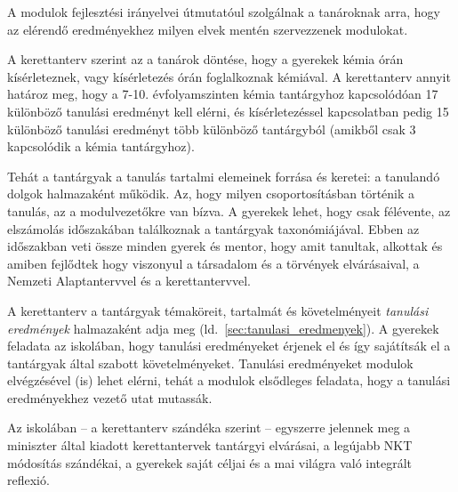A modulok fejlesztési irányelvei útmutatóul szolgálnak a tanároknak arra, hogy az elérendő eredményekhez milyen elvek mentén szervezzenek modulokat.


A kerettanterv szerint az a tanárok döntése, hogy a gyerekek kémia órán kísérleteznek, vagy kísérletezés órán foglalkoznak kémiával. A kerettanterv annyit határoz meg, hogy  a 7-10. évfolyamszinten kémia tantárgyhoz kapcsolódóan 17 különböző tanulási eredményt kell elérni, és kísérletezéssel kapcsolatban pedig 15 különböző tanulási eredményt több különböző tantárgyból (amikből csak 3 kapcsolódik a kémia tantárgyhoz).

Tehát a tantárgyak a tanulás tartalmi elemeinek forrása és keretei: a tanulandó dolgok halmazaként működik. Az, hogy milyen csoportosításban történik a tanulás, az a modulvezetőkre van bízva. A gyerekek lehet, hogy csak félévente, az elszámolás időszakában találkoznak a tantárgyak taxonómiájával. Ebben az időszakban veti össze minden gyerek és mentor, hogy amit tanultak, alkottak és amiben fejlődtek hogy viszonyul a társadalom és a törvények elvárásaival, a Nemzeti Alaptantervvel és a kerettantervvel.

A kerettanterv a tantárgyak témaköreit, tartalmát és követelményeit \emph{tanulási eredmények} halmazaként adja meg (ld.~\ref{sec:tanulasi_eredmenyek}). A gyerekek feladata az iskolában, hogy tanulási eredményeket érjenek el és így sajátítsák el a tantárgyak által szabott követelményeket. Tanulási eredményeket modulok elvégzésével (is) lehet elérni, tehát a modulok elsődleges feladata, hogy a tanulási eredményekhez vezető utat mutassák.

Az iskolában -- a kerettanterv szándéka szerint -- egyszerre jelennek meg a miniszter által kiadott kerettantervek tantárgyi elvárásai, a legújabb NKT módosítás szándékai, a gyerekek saját céljai és a mai világra való integrált reflexió. 